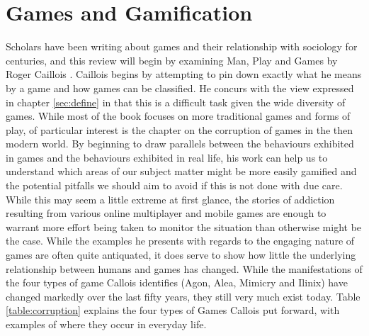 \documentclass[12pt,a4paper,twoside]{report}
\begin{document}
\section{Games and Gamification}
\label{bartle}
Scholars have been writing about games and their relationship with sociology for centuries, and this review will begin by examining Man, Play and Games by Roger Caillois \cite{caillois1961man}. Caillois begins by attempting to pin down exactly what he means by a game and how games can be classified. He concurs with the view expressed in chapter \ref{sec:define} in that this is a difficult task given the wide diversity of games. While most of the book focuses on more traditional games and forms of play, of particular interest is the chapter on the corruption of games in the then modern world. By beginning to draw parallels between the behaviours exhibited in games and the behaviours exhibited in real life, his work can help us to understand which areas of our subject matter might be more easily gamified and the potential pitfalls we should aim to avoid if this is not done with due care. While this may seem a little extreme at first glance, the stories of addiction resulting from various online multiplayer and mobile games are enough to warrant more effort being taken to monitor the situation than otherwise might be the case. While the examples he presents with regards to the engaging nature of games are often quite antiquated, it does serve to show how little the underlying relationship between humans and games has changed. While the manifestations of the four types of game Callois identifies (Agon, Alea, Mimicry and Ilinix) have changed markedly over the last fifty years, they still very much exist today. Table \ref{table:corruption} explains the four types of Games Callois put forward, with examples of where they occur in everyday life.
\end{document}
